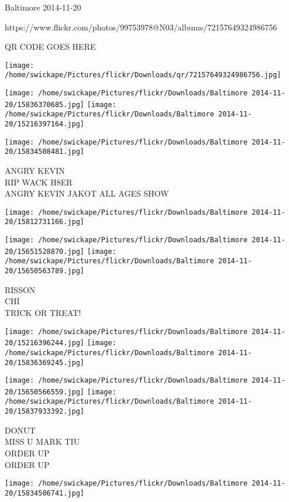 \documentclass[10pt,letterpaper]{article}
\begin{document}
Baltimore 2014-11-20

https://www.flickr.com/photos/99753978@N03/albums/72157649324986756

QR CODE GOES HERE

\texttt{[image: /home/swickape/Pictures/flickr/Downloads/qr/72157649324986756.jpg]}
\pagebreak

\texttt{[image: /home/swickape/Pictures/flickr/Downloads/Baltimore 2014-11-20/15836370685.jpg]}
\texttt{[image: /home/swickape/Pictures/flickr/Downloads/Baltimore 2014-11-20/15216397164.jpg]}

\texttt{[image: /home/swickape/Pictures/flickr/Downloads/Baltimore 2014-11-20/15834508481.jpg]}

ANGRY KEVIN\\
RIP WACK H8ER\\
ANGRY KEVIN JAKOT ALL AGES SHOW\\
\pagebreak

\texttt{[image: /home/swickape/Pictures/flickr/Downloads/Baltimore 2014-11-20/15812731166.jpg]}

\vspace{0.25in}
\texttt{[image: /home/swickape/Pictures/flickr/Downloads/Baltimore 2014-11-20/15651528870.jpg]}
\texttt{[image: /home/swickape/Pictures/flickr/Downloads/Baltimore 2014-11-20/15650563789.jpg]}

RISSON\\
CHI\\
TRICK OR TREAT!\\
\pagebreak

\texttt{[image: /home/swickape/Pictures/flickr/Downloads/Baltimore 2014-11-20/15216396244.jpg]}
\texttt{[image: /home/swickape/Pictures/flickr/Downloads/Baltimore 2014-11-20/15836369245.jpg]}

\texttt{[image: /home/swickape/Pictures/flickr/Downloads/Baltimore 2014-11-20/15650566559.jpg]}
\texttt{[image: /home/swickape/Pictures/flickr/Downloads/Baltimore 2014-11-20/15837933392.jpg]}

DONUT\\
MISS U MARK TIU\\
ORDER UP\\
ORDER UP\\
\pagebreak

\texttt{[image: /home/swickape/Pictures/flickr/Downloads/Baltimore 2014-11-20/15834506741.jpg]}
\end{document}
